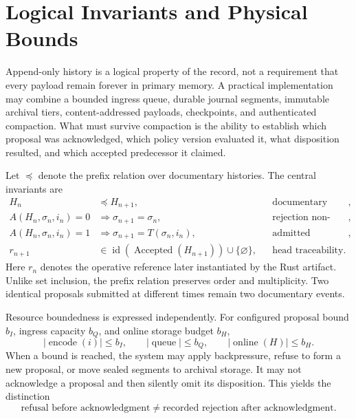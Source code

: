 \documentclass[11pt]{article}
\begin{document}
\section{Logical Invariants and Physical Bounds}

Append-only history is a logical property of the record, not a requirement that every payload remain forever in primary memory. A practical implementation may combine a bounded ingress queue, durable journal segments, immutable archival tiers, content-addressed payloads, checkpoints, and authenticated compaction. What must survive compaction is the ability to establish which proposal was acknowledged, which policy version evaluated it, what disposition resulted, and which accepted predecessor it claimed.

Let $\preceq$ denote the prefix relation over documentary histories. The central invariants are
\begin{align}
  H_n &\preceq H_{n+1},
  &&\text{documentary monotonicity}, \label{eq:inv-monotonicity}\\
  A(H_n,\sigma_n,i_n)=0
  &\Longrightarrow \sigma_{n+1}=\sigma_n,
  &&\text{rejection non-effect}, \label{eq:inv-rejection}\\
  A(H_n,\sigma_n,i_n)=1
  &\Longrightarrow \sigma_{n+1}=T(\sigma_n,i_n),
  &&\text{admitted transition}, \label{eq:inv-admission}\\
  r_{n+1}
  &\in\operatorname{id}(\operatorname{Accepted}(H_{n+1}))\cup\{\varnothing\},
  &&\text{head traceability}. \label{eq:inv-head}
\end{align}
Here $r_n$ denotes the operative reference later instantiated by the Rust artifact. Unlike set inclusion, the prefix relation preserves order and multiplicity. Two identical proposals submitted at different times remain two documentary events.

Resource boundedness is expressed independently. For configured proposal bound $b_I$, ingress capacity $b_Q$, and online storage budget $b_H$,
\begin{equation}
  |\operatorname{encode}(i)|\leq b_I,
  \qquad |\operatorname{queue}|\leq b_Q,
  \qquad |\operatorname{online}(H)|\leq b_H.
  \label{eq:resource-bounds}
\end{equation}
When a bound is reached, the system may apply backpressure, refuse to form a new proposal, or move sealed segments to archival storage. It may not acknowledge a proposal and then silently omit its disposition. This yields the distinction
\begin{equation}
  \text{refusal before acknowledgment}
  \neq
  \text{recorded rejection after acknowledgment}.
  \label{eq:pre-post-ack}
\end{equation}
\end{document}
